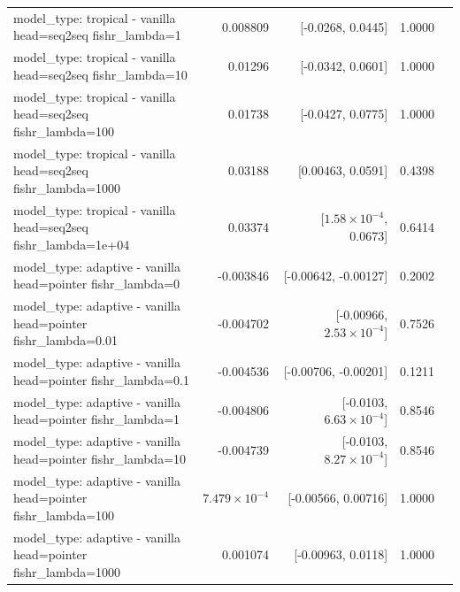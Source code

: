 \documentclass[10pt]{article}
\makeatletter
\newcommand{\stackcell}[1]{\begin{tabular}[t]{@{}l@{}}#1\end{tabular}}
\makeatother
\begin{document}
{\begin{longtable}{lrrrl}
\stackcell{model\_type: tropical - vanilla\\\footnotesize head=seq2seq fishr\_lambda=1 } & 0.008809 & [-0.0268, 0.0445] & 1.0000 & \\
\stackcell{model\_type: tropical - vanilla\\\footnotesize head=seq2seq fishr\_lambda=10 } & 0.01296 & [-0.0342, 0.0601] & 1.0000 & \\
\stackcell{model\_type: tropical - vanilla\\\footnotesize head=seq2seq fishr\_lambda=100 } & 0.01738 & [-0.0427, 0.0775] & 1.0000 & \\
\stackcell{model\_type: tropical - vanilla\\\footnotesize head=seq2seq fishr\_lambda=1000 } & 0.03188 & [0.00463, 0.0591] & 0.4398 & \\
\stackcell{model\_type: tropical - vanilla\\\footnotesize head=seq2seq fishr\_lambda=1e+04 } & 0.03374 & [$1.58\times10^{-4}$, 0.0673] & 0.6414 & \\
\stackcell{model\_type: adaptive - vanilla\\\footnotesize head=pointer fishr\_lambda=0 } & -0.003846 & [-0.00642, -0.00127] & 0.2002 & \\
\stackcell{model\_type: adaptive - vanilla\\\footnotesize head=pointer fishr\_lambda=0.01 } & -0.004702 & [-0.00966, $2.53\times10^{-4}$] & 0.7526 & \\
\stackcell{model\_type: adaptive - vanilla\\\footnotesize head=pointer fishr\_lambda=0.1 } & -0.004536 & [-0.00706, -0.00201] & 0.1211 & \\
\stackcell{model\_type: adaptive - vanilla\\\footnotesize head=pointer fishr\_lambda=1 } & -0.004806 & [-0.0103, $6.63\times10^{-4}$] & 0.8546 & \\
\stackcell{model\_type: adaptive - vanilla\\\footnotesize head=pointer fishr\_lambda=10 } & -0.004739 & [-0.0103, $8.27\times10^{-4}$] & 0.8546 & \\
\stackcell{model\_type: adaptive - vanilla\\\footnotesize head=pointer fishr\_lambda=100 } & $7.479\times10^{-4}$ & [-0.00566, 0.00716] & 1.0000 & \\
\stackcell{model\_type: adaptive - vanilla\\\footnotesize head=pointer fishr\_lambda=1000 } & 0.001074 & [-0.00963, 0.0118] & 1.0000 & \\

\end{longtable}}
\end{document}
